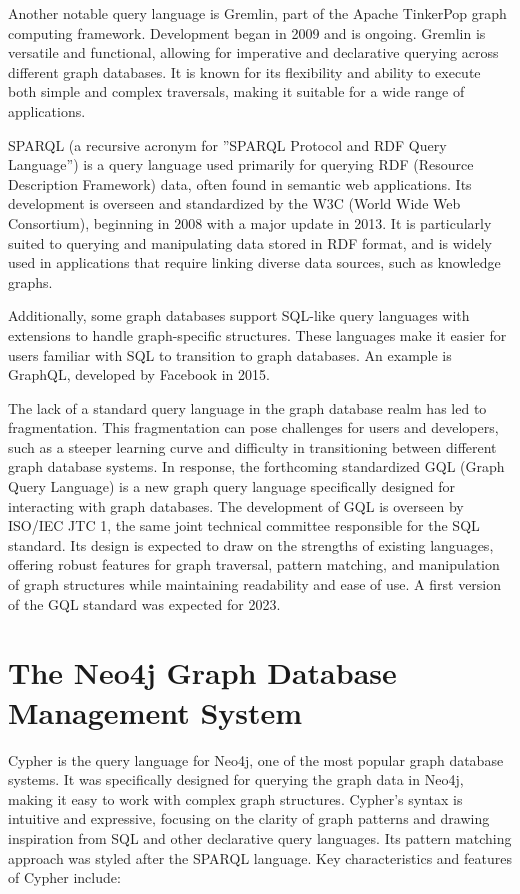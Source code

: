 Another notable query language is Gremlin, part of the Apache TinkerPop graph computing framework. Development began in 2009 and is ongoing. Gremlin is versatile and functional, allowing for imperative and declarative querying across different graph databases. It is known for its flexibility and ability to execute both simple and complex traversals, making it suitable for a wide range of applications.

SPARQL (a recursive acronym for ''SPARQL Protocol and RDF Query Language'') is a query language used primarily for querying RDF (Resource Description Framework) data, often found in semantic web applications. Its development is overseen and standardized by the W3C (World Wide Web Consortium), beginning in 2008 with a major update in 2013. It is particularly suited to querying and manipulating data stored in RDF format, and is widely used in applications that require linking diverse data sources, such as knowledge graphs.

Additionally, some graph databases support SQL-like query languages with extensions to handle graph-specific structures. These languages make it easier for users familiar with SQL to transition to graph databases. An example is GraphQL, developed by Facebook in 2015. 

The lack of a standard query language in the graph database realm has led to fragmentation. This fragmentation can pose challenges for users and developers, such as a steeper learning curve and difficulty in transitioning between different graph database systems. In response, the forthcoming standardized GQL (Graph Query Language) is a new graph query language specifically designed for interacting with graph databases. The development of GQL is overseen by ISO/IEC JTC 1, the same joint technical committee responsible for the SQL standard. Its design is expected to draw on the strengths of existing languages, offering robust features for graph traversal, pattern matching, and manipulation of graph structures while maintaining readability and ease of use. A first version of the GQL standard was expected for 2023.

\section{The Neo4j Graph Database Management System}

Cypher is the query language for Neo4j, one of the most popular graph database systems. It was specifically designed for querying the graph data in Neo4j, making it easy to work with complex graph structures. Cypher's syntax is intuitive and expressive, focusing on the clarity of graph patterns and drawing inspiration from SQL and other declarative query languages. Its pattern matching approach was styled after the SPARQL language. Key characteristics and features of Cypher include:

